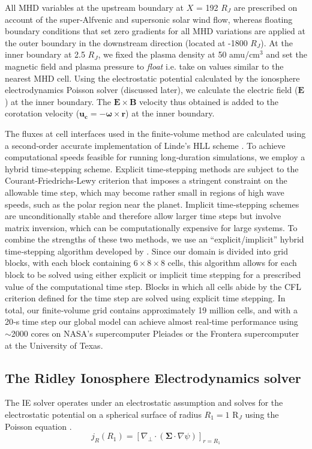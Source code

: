 All MHD variables at the upstream boundary at $X$ = 192 $R_J$ are prescribed on account of the super‐Alfvenic and supersonic solar wind flow, whereas floating boundary conditions that set zero gradients for all MHD variations are applied at the outer boundary in the downstream direction (located at -1800 $R_J$). At the inner boundary at 2.5 $R_J$, we fixed the plasma density at 50 amu/cm$^3$ and set the magnetic field and plasma pressure to \emph{float} i.e. take on values similar to the nearest MHD cell. Using the electrostatic potential calculated by the ionosphere electrodynamics Poisson solver (discussed later), we calculate the electric field ($\mathbf{E}$) at the inner boundary. The $\mathbf{E} \times \mathbf{B}$ velocity thus obtained is added to the corotation velocity ($\mathbf{u_c} = -\mathbf{\omega} \times \mathbf{r}$) at the inner boundary.

The fluxes at cell interfaces used in the finite‐volume method are calculated using a second‐order accurate implementation of Linde's HLL scheme \cite{Linde2002}. To achieve computational speeds feasible for running long‐duration simulations, we employ a hybrid time‐stepping scheme. Explicit time‐stepping methods are subject to the Courant‐Friedrichs‐Lewy criterion that imposes a stringent constraint on the allowable time step, which may become rather small in regions of high wave speeds, such as the polar region near the planet. Implicit time‐stepping schemes are unconditionally stable and therefore allow larger time steps but involve matrix inversion, which can be computationally expensive for large systems. To combine the strengths of these two methods, we use an “explicit/implicit” hybrid time‐stepping algorithm developed by \cite{Toth2006AGrids}. Since our domain is divided into grid blocks, with each block containing $6 \times 8 \times 8$ cells, this algorithm allows for each block to be solved using either explicit or implicit time stepping for a prescribed value of the computational time step. Blocks in which all cells abide by the CFL criterion defined for the time step are solved using explicit time stepping. In total, our finite‐volume grid contains approximately 19 million cells, and with a 20‐s time step our global model can achieve almost real‐time performance using $\sim$2000 cores on NASA's supercomputer Pleiades or the Frontera supercomputer at the University of Texas.

\subsection{The Ridley Ionosphere Electrodynamics solver}
The IE solver operates under an electrostatic assumption and solves for the electrostatic potential on a spherical surface of radius $R_1=1$ R$_J$ using the Poisson equation \cite{Ridley2004IonosphericConductance}.
\begin{equation}
    j_R \left(R_1\right) = \left[ \nabla_\perp \cdot \left( \mathbf{\Sigma} \cdot \nabla \psi \right) \right]_{r=R_1}
\end{equation}

